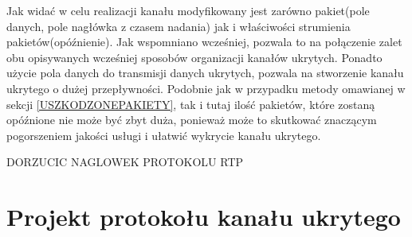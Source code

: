 \documentclass[a4paper, twoside, 12pt]{report}
\begin{document}
        Jak widać w celu realizacji kanału modyfikowany jest zarówno pakiet(pole danych,
        pole nagłówka z czasem nadania) jak i właściwości strumienia pakietów(opóźnienie).
        Jak wspomniano wcześniej, pozwala to na połączenie zalet obu opisywanych
        wcześniej sposobów organizacji kanałów ukrytych. Ponadto użycie pola danych
        do transmisji danych ukrytych, pozwala na stworzenie kanału ukrytego o
        dużej przepływności. Podobnie jak w przypadku metody omawianej w sekcji
        \ref{USZKODZONEPAKIETY}, tak i tutaj ilość pakietów, które zostaną opóźnione
        nie może być zbyt duża, ponieważ może to skutkować znaczącym pogorszeniem
        jakości usługi i ułatwić wykrycie kanału ukrytego.

        DORZUCIC NAGLOWEK PROTOKOLU RTP

\chapter{Projekt protokołu kanału ukrytego}
\end{document}

